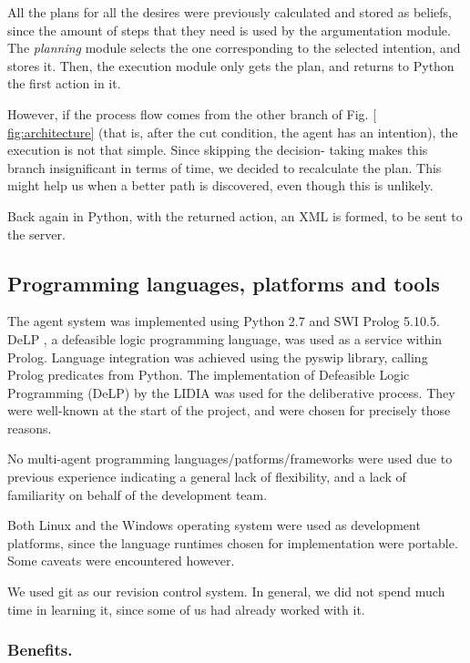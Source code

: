 \documentclass{llncs2e/llncs}
\begin{document}
    All the plans for all the desires were previously calculated and stored as 
    beliefs, since the amount of steps that they need is used by the 
    argumentation module. The \textit{planning} module selects the one 
    corresponding to the selected intention, and stores it. Then, the 
    execution module only gets the plan, and returns to Python the first 
    action in it.

    However, if the process flow comes from the other branch of Fig. \ref{
    fig:architecture} (that is, after the cut condition, the agent has an 
    intention), the execution is not that simple. Since skipping the decision-
    taking makes this branch insignificant in terms of time, we decided to 
    recalculate the plan. This might help us when a better path is discovered, 
    even though this is unlikely.

    Back again in Python, with the returned action, an XML is formed, to be sent 
    to the server.

\subsection{Programming languages, platforms and tools}

    The agent system was implemented using Python 2.7 and SWI Prolog 5.10.5. DeLP 
    \cite{Garcia:2004a}, a defeasible logic programming language, was used as a 
    service within Prolog. 
    Language integration was achieved using the pyswip library, calling Prolog 
    predicates from Python. The implementation of Defeasible Logic Programming 
    (DeLP) by the LIDIA was used for the deliberative process. They were 
    well-known at the start of the project, and were chosen for precisely those
    reasons.

    No multi-agent programming languages/patforms/frameworks were used due to 
    previous experience indicating a general lack of flexibility, and a lack of 
    familiarity on behalf of the development team.
    
    Both Linux and the Windows operating system were used as development 
    platforms, since the language runtimes chosen for implementation were 
    portable. Some caveats were encountered however.

    We used git as our revision control system. In general, we did not spend much 
    time in learning it, since some of us had already worked with it.

\subsubsection{Benefits.}
    
\end{document}
